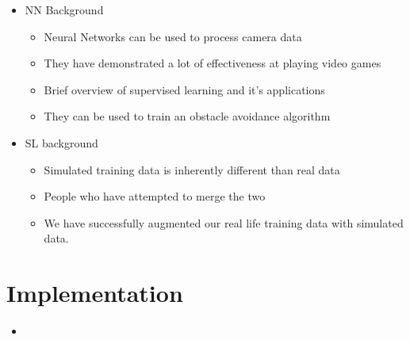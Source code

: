 \documentclass[paper=a4, fontsize=11pt]{scrartcl} %
\begin{document}
\begin{itemize}
	\item  NN Background
	\begin{itemize}
		\item Neural Networks can be used to process camera data
		\item They have demonstrated a lot of effectiveness at playing video games
		\item Brief overview of supervised learning and it's applications
		\item They can be used to train an obstacle avoidance algorithm
	\end{itemize}
\end{itemize}

\begin{itemize}
	\item SL background
	\begin{itemize}
		\item Simulated training data is inherently different than real data
		\item People who have attempted to merge the two
		\item We have successfully augmented our real life training data with simulated data.
	\end{itemize}
\end{itemize}

\section{Implementation}
\begin{itemize}
	\item 
\end{itemize}
\end{document}
